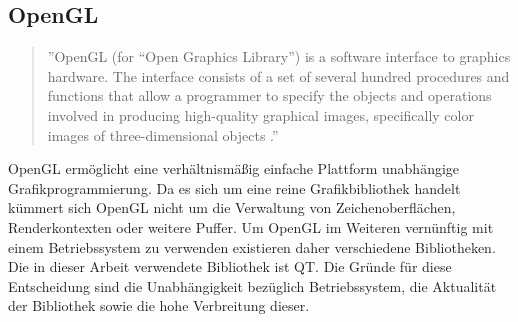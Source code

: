 \subsection{OpenGL}
\begin{quote}
	''OpenGL (for “Open Graphics Library”) is a software interface to graphics hardware.
	The interface consists of a set of several hundred procedures and functions
	that allow a programmer to specify the objects and operations involved in producing
	high-quality graphical images, specifically color images of three-dimensional
	objects \citep{OpenGLDoku}.''
\end{quote}
OpenGL ermöglicht eine verhältnismäßig einfache Plattform unabhängige Grafikprogrammierung. Da es sich um eine reine Grafikbibliothek handelt kümmert sich OpenGL nicht um die Verwaltung von Zeichenoberflächen, Renderkontexten oder weitere Puffer. Um OpenGL im Weiteren vernünftig mit einem Betriebssystem zu verwenden existieren daher verschiedene Bibliotheken. Die in dieser Arbeit verwendete Bibliothek ist QT. Die Gründe für diese Entscheidung sind die Unabhängigkeit bezüglich Betriebssystem, die Aktualität der Bibliothek sowie die hohe Verbreitung dieser.